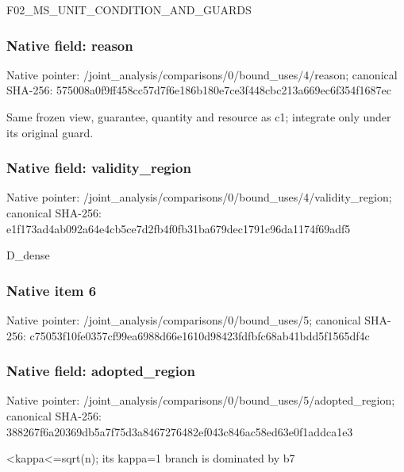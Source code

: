 \documentclass[10pt,a4paper]{article}
\begin{document}
\begingroup\raggedright\sloppy F02\_\allowbreak{}MS\_\allowbreak{}UNIT\_\allowbreak{}CONDITION\_\allowbreak{}AND\_\allowbreak{}GUARDS\par\endgroup

\subsubsection{Native field: reason}
Native pointer: /joint\_\allowbreak{}analysis/comparisons/0/bound\_\allowbreak{}uses/4/reason; canonical SHA-256: 575008a0f9ff458cc57d7f6e186b180e7ce3f448cbc213a669ec6f354f1687ec

\begingroup\raggedright\sloppy Same frozen view,\allowbreak{} guarantee,\allowbreak{} quantity and resource as c1;\allowbreak{} integrate only under its original guard.\par\endgroup

\subsubsection{Native field: validity\_\allowbreak{}region}
Native pointer: /joint\_\allowbreak{}analysis/comparisons/0/bound\_\allowbreak{}uses/4/validity\_\allowbreak{}region; canonical SHA-256: e1f173ad4ab092a64e4cb5ce7d2fb4f0fb31ba679dec1791c96da1174f69adf5

\begingroup\raggedright\sloppy D\_\allowbreak{}dense\par\endgroup

\subsubsection{Native item 6}
Native pointer: /joint\_\allowbreak{}analysis/comparisons/0/bound\_\allowbreak{}uses/5; canonical SHA-256: c75053f10fe0357cf99ea6988d66e1610d98423fdfbfc68ab41bdd5f1565df4c

\subsubsection{Native field: adopted\_\allowbreak{}region}
Native pointer: /joint\_\allowbreak{}analysis/comparisons/0/bound\_\allowbreak{}uses/5/adopted\_\allowbreak{}region; canonical SHA-256: 388267f6a20369db5a7f75d3a8467276482ef043c846ac58ed63e0f1addca1e3

\begingroup\raggedright{}<kappa<=\allowbreak{}sqrt(n);\allowbreak{} its kappa=\allowbreak{}1 branch is dominated by b7\par\endgroup
\end{document}
